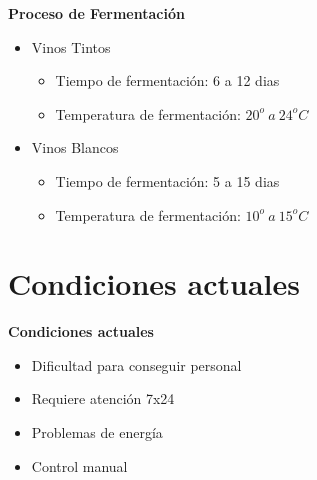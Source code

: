 \documentclass[11pt]{beamer}
\begin{document}
\begin{frame}{\LARGE{\textbf{Proceso de Fermentación}}}
  \fontsize{18pt}{18}\selectfont
  \vspace{-30px}
  \begin{itemize}
      \vspace{15px}
    \item Vinos Tintos
      \vspace{5px}
      \begin{itemize}
        \item Tiempo de fermentación: 6 a 12 dias
        \vspace{5px}
        \item Temperatura de fermentación: $20^o\ a\ 24^oC$
      \end{itemize}
        \vspace{15px}
      \item Vinos Blancos
        \vspace{5px}
        \begin{itemize}
          \item Tiempo de fermentación: 5 a 15 dias
          \vspace{5px}
          \item Temperatura de fermentación: $10^o\ a\ 15^oC$
        \end{itemize}
  \end{itemize}	
\end{frame}


\section[Problema]{Condiciones actuales}

\begin{frame}{\textbf{\LARGE{Condiciones actuales}}}
  \fontsize{18pt}{18}\selectfont
  \begin{itemize}
    \item { Dificultad para conseguir personal }
        \vspace{20px}
    \item Requiere atención 7x24
        \vspace{20px}
    \item Problemas de energía
        \vspace{10px}
    \item Control manual
  \end{itemize}
\end{frame}
\end{document}
